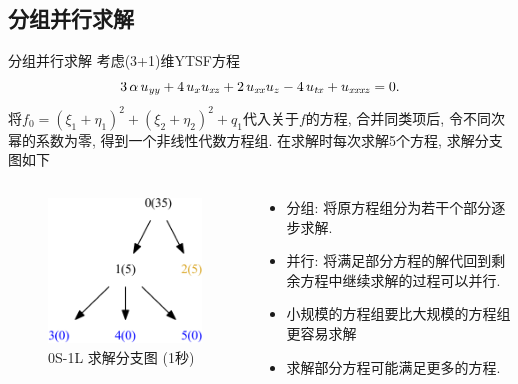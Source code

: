 \documentclass[handout]{beamer}
\newcommand{\sbrace}[1]{\left(#1\right)}
\begin{document}
\subsection{分组并行求解}
\begin{frame}{分组并行求解}
\small 
考虑(3+1)维YTSF方程
\begin{equation}
  3\,\alpha\,u_{{{\it yy}}}+4\,u_{{x}}u_{{{\it xz}}}+2\,u_{{{\it xx}}}u_{{z}}-4\,u_{{{\it tx}}}+u_{{{\it xxxz}}}=0. 
\end{equation}
将$f_0 = \sbrace{\xi_1+\eta_1}^2+\sbrace{\xi_2+\eta_2}^2+q_1$代入关于$f$的方程, 合并同类项后, 令不同次幂的系数为零, 得到一个非线性代数方程组. 在求解时每次求解5个方程, 求解分支图如下
\begin{columns}
\begin{column}{0.4\textwidth}
\begin{figure}
\centering
\includegraphics[height=0.3\textheight]{../paper/fig/0S1L.pdf}
\caption{0S-1L 求解分支图 (1秒)}
\end{figure}
\end{column}
\begin{column}{0.6\textwidth}
\begin{itemize}
\item 分组: 将原方程组分为若干个部分逐步求解.
\item 并行: 将满足部分方程的解代回到剩余方程中继续求解的过程可以并行.
\item 小规模的方程组要比大规模的方程组更容易求解
\item 求解部分方程可能满足更多的方程.
\end{itemize}
\end{column}
\end{columns}
\end{frame}
\end{document}

